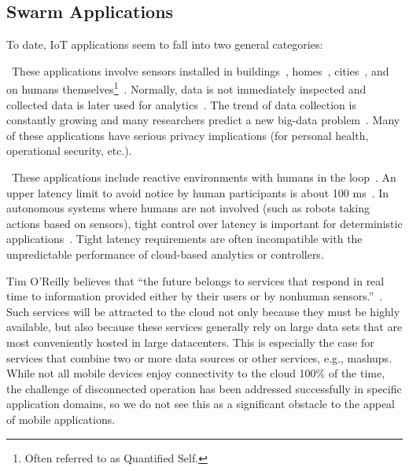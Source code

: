 \subsection{Swarm Applications}
\label{sec:swarm-applications}

To date, IoT applications seem to fall into two general categories:

~These applications involve sensors
installed in buildings~\cite{dawson2010smap}, homes~\cite{hnat2011hitchhiker},
cities~\cite{sfpark}, and on humans themselves\footnote{Often referred to as
  Quantified Self.}~\cite{fitbit, swan2013quantified}.  Normally, data is not
immediately inspected and collected data is later used for
analytics~\cite{kolter2011redd}.  The trend of data collection is constantly
growing and many researchers predict a new big-data problem~\cite{diaz2012big,
  zaslavsky2013sensing}.  Many of these applications have serious privacy
implications (for personal health, operational security, etc.).

~These applications
include reactive environments with humans in the
loop~\cite{cooperstock1997reactive}.
An upper latency limit to avoid notice by human participants is about 100
ms~\cite{nielsen1994usability}.  In autonomous systems where humans are not
involved (such as robots taking actions based on sensors), tight control over
latency is important for deterministic
applications~\cite{eidson2012distributed}.  Tight latency requirements are often
incompatible with the unpredictable performance of cloud-based analytics or
controllers.

Tim O’Reilly believes that ``the future belongs to services that respond in real
time to information provided either by their users or by nonhuman
sensors.''~\cite{siegele2008let}. Such services will be attracted to the cloud
not only because they must be highly available, but also because these services
generally rely on large data sets that are most conveniently hosted in large
datacenters. This is especially the case for services that combine two or more
data sources or other services, e.g., mashups. While not all mobile devices
enjoy connectivity to the cloud 100\% of the time, the challenge of disconnected
operation has been addressed successfully in specific application domains, so we
do not see this as a significant obstacle to the appeal of mobile applications.

